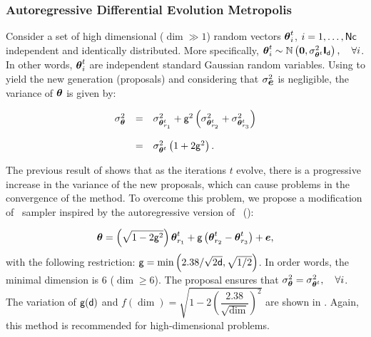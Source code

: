 \subsubsection{Autoregressive Differential Evolution Metropolis}

Consider a set of high dimensional ($\dim \gg 1$) random vectors $\boldsymbol{{\theta}}^{{t}}_{i}$, $i=1,\dots,\mathsf{Nc}$ independent and identically distributed.
More specifically, $\boldsymbol{{\theta}}^{{t}}_{i}\sim\mathbb{N}\left({\boldmath{\mbox{$0$}}},{\sigma_{\boldsymbol{{\theta}}^{{t}}}^{2}}\boldsymbol{\mathsf{I}}_{\mathsf{d}}\right),\quad \forall i$.
In other words, $\boldsymbol{{\theta}}^{{t}}_{i}$ are independent standard Gaussian random variables.
Using  to yield the new generation (proposals) and considering that ${\sigma_{{\boldmath{\mbox{$e$}}}}^{2}}$ is negligible, the variance of $\boldsymbol{{\theta}}$ is given by:

\begin{equation}
 \begin{array}{rcl}
  {\sigma_{\boldsymbol{{\theta}}}^{2}} & = & {\sigma_{\boldsymbol{{\theta}}^{{t}}_{r_1}}^{2}} + \mathsf{g}^{2}\left( {\sigma_{\boldsymbol{{\theta}}^{{t}}_{r_2}}^{2}} + {\sigma_{\boldsymbol{{\theta}}^{{t}}_{r_3}}^{2}} \right)\\ \\
                & = & {\sigma_{\boldsymbol{{\theta}}^{{t}}}^{2}} \left( 1 + 2 \mathsf{g}^{2} \right).
 \end{array}
 \label{eq:var}
\end{equation}

\noindent The previous result of  shows that as the iterations $t$ evolve, there is a progressive increase in the variance of the new proposals, which can cause problems in the convergence of the method.
To overcome this problem, we propose a modification of \DE\ sampler  inspired by the autoregressive version of \RW\ ():

\begin{equation}
 \boldsymbol{{\theta}} = \left( \sqrt{1 - 2 \mathsf{g}^2} \right) \boldsymbol{{\theta}}^{{t}}_{r_1} + \mathsf{g}\left( \boldsymbol{{\theta}}^{{t}}_{r_2}-\boldsymbol{{\theta}}^{{t}}_{r_3} \right) + {\boldmath{\mbox{$e$}}},
 \label{proposalARDE}
\end{equation}
\noindent with the following restriction: $\mathsf{g} = \min\left(2.38 / \sqrt{2\mathsf{d}}, \sqrt{1/2} \right)$.
In order words, the minimal dimension is $6$ ($\dim \geqslant 6$).
The proposal  ensures that ${\sigma_{\boldsymbol{{\theta}}}^{2}} = {\sigma_{\boldsymbol{{\theta}}^{{t}}}^{2}},\quad \forall i$.
The variation of $\mathsf{g}(\mathsf{d})$ and $f(\dim) = \sqrt{1 - 2\left(\dfrac{2.38}{\sqrt{\dim}}\right)^2}$ are shown in .
Again, this method is recommended for high-dimensional problems.

